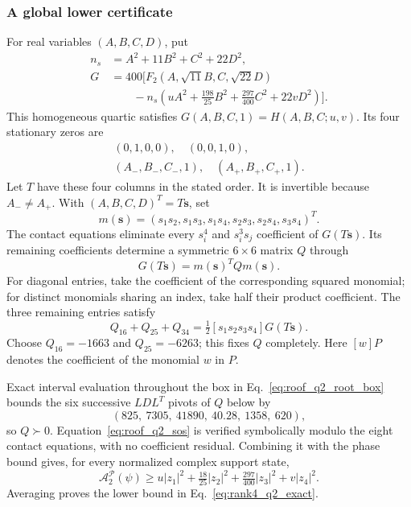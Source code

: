 \documentclass[11pt]{article}
\newcommand{\A}{\mathcal A}
\begin{document}
\subsubsection{A global lower certificate}
For real variables $(A,B,C,D)$, put
\begin{align}
 n_s&=A^2+11B^2+C^2+22D^2,\nonumber\\
 G&=400\bigl[F_2(A,\sqrt{11}B,C,\sqrt{22}D)\nonumber\\
 &\qquad-n_s(uA^2+\tfrac{198}{25}B^2
                   +\tfrac{297}{400}C^2+22vD^2)\bigr].
\end{align}
This homogeneous quartic satisfies $G(A,B,C,1)=H(A,B,C;u,v)$. Its four stationary zeros are
\begin{gather}
 (0,1,0,0),\quad(0,0,1,0),\nonumber\\
 (A_-,B_-,C_-,1),\quad(A_+,B_+,C_+,1).
\end{gather}
Let $T$ have these four columns in the stated order. It is invertible because $A_-\ne A_+$. With $(A,B,C,D)^T=T\mathbf s$, set
\begin{equation}
 m(\mathbf s)=(s_1s_2,s_1s_3,s_1s_4,s_2s_3,s_2s_4,s_3s_4)^T.
\end{equation}
The contact equations eliminate every $s_i^4$ and $s_i^3s_j$ coefficient of $G(T\mathbf s)$. Its remaining coefficients determine a symmetric $6\times6$ matrix $Q$ through
\begin{equation}\label{eq:roof_q2_sos}
 G(T\mathbf s)=m(\mathbf s)^TQm(\mathbf s).
\end{equation}
For diagonal entries, take the coefficient of the corresponding squared monomial; for distinct monomials sharing an index, take half their product coefficient. The three remaining entries satisfy
\begin{equation}
 Q_{16}+Q_{25}+Q_{34}
 =\tfrac12[s_1s_2s_3s_4]G(T\mathbf s).
\end{equation}
Choose $Q_{16}=-1663$ and $Q_{25}=-6263$; this fixes $Q$ completely. Here $[w]P$ denotes the coefficient of the monomial $w$ in $P$.

Exact interval evaluation throughout the box in Eq.~\eqref{eq:roof_q2_root_box} bounds the six successive $LDL^T$ pivots of $Q$ below by
\begin{equation}
 (825,\ 7305,\ 41890,\ 40.28,\ 1358,\ 620),
\end{equation}
so $Q\succ0$. Equation~\eqref{eq:roof_q2_sos} is verified symbolically modulo the eight contact equations, with no coefficient residual. Combining it with the phase bound gives, for every normalized complex support state,
\begin{equation}
 \A_2^{\mathcal P}(\psi)\ge
 u|z_1|^2+\tfrac{18}{25}|z_2|^2+
 \tfrac{297}{400}|z_3|^2+v|z_4|^2.
\end{equation}
Averaging proves the lower bound in Eq.~\eqref{eq:rank4_q2_exact}.
\end{document}
